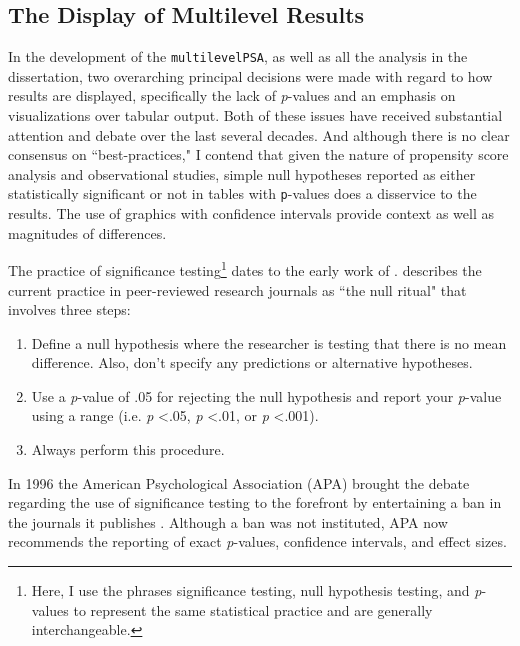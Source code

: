 \documentclass[letterpaper,12p,twoside]{article} %
\begin{document}
\subsection{The Display of Multilevel Results}

In the development of the \texttt{multilevelPSA}, as well as all the analysis in the dissertation, two overarching principal decisions were made with regard to how results are displayed, specifically the lack of \textit{p}-values and an emphasis on visualizations over tabular output. Both of these issues have received substantial attention and debate over the last several decades. And although there is no clear consensus on ``best-practices," I contend that given the nature of propensity score analysis and observational studies, simple null hypotheses reported as either statistically significant or not in tables with \texttt{p}-values does a disservice to the results. The use of graphics with confidence intervals provide context as well as magnitudes of differences.


The practice of significance testing\footnote{Here, I use the phrases significance testing, null hypothesis testing, and \textit{p}-values to represent the same statistical practice and are generally interchangeable.} dates to the early work of .  describes the current practice in peer-reviewed research journals as ``the null ritual" that involves three steps:

\begin{enumerate}
    \item Define a null hypothesis where the researcher is testing that there is no mean difference. Also, don't specify any predictions or alternative hypotheses.
    \item Use a \textit{p}-value of .05 for rejecting the null hypothesis and report your \textit{p}-value using a range (i.e. \textit{p} \textless .05, \textit{p} \textless .01, or \textit{p} \textless .001).
    \item Always perform this procedure.
\end{enumerate}

\noindent In 1996 the American Psychological Association (APA) brought the debate regarding the use of significance testing to the forefront by entertaining a ban in the journals it publishes \cite{Shrout1997,Hunter1997,Harris1997,Abelson1997,Scarr1997,Estes1997}. Although a ban was not instituted, APA now recommends the reporting of exact \textit{p}-values, confidence intervals, and effect sizes. 
\end{document}
